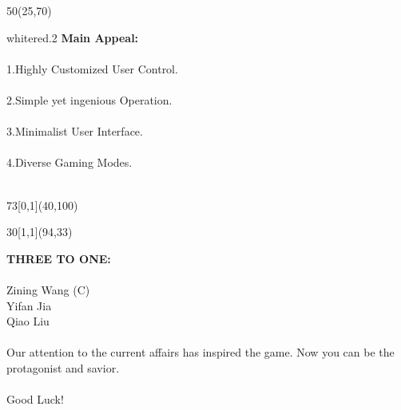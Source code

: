 \documentclass[hyperref={pdfpagelabels=false}]{beamer}
\begin{document}
\begin{frame}
	\begin{textblock}{50}(25,70)
		\begin{transparentbox}{white}{red}{.2}
				\centering 
				\huge\textbf{{Main Appeal:}} \\\hspace*{\fill} \\
				1.Highly Customized User Control. \\\hspace*{\fill} \\
				2.Simple yet ingenious Operation.\\\hspace*{\fill} \\
				3.Minimalist User Interface.\\\hspace*{\fill} \\
				4.Diverse Gaming Modes.\\\hspace*{\fill} \\             	 
		\end{transparentbox}
	\end{textblock} 

	\begin{textblock}{73}[0,1](40,100)
		\logos[light]
	\end{textblock}

	\begin{textblock}{30}[1,1](94,33)
		\begin{blankbox}
			\huge\textbf{{THREE TO ONE:}} \\\hspace*{\fill} \\
			\Large{Zining Wang (C)}\\ 
			Yifan Jia  \\
			Qiao Liu \\\hspace*{\fill} \\
			Our attention to the current affairs has inspired the game. Now you can be the protagonist and savior. \\\hspace*{\fill} \\\large{Good Luck!}
			
		\end{blankbox}
	\end{textblock}


\end{frame}
\end{document}
